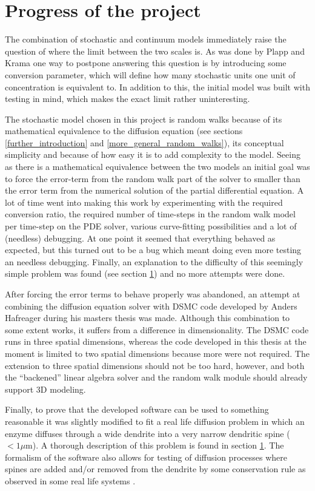 \documentclass[main.tex]{subfiles}
\begin{document}
\section{Progress of the project}
The combination of stochastic and continuum models immediately raise the question of where the limit between the two scales is. 
As was done by Plapp and Krama \cite{plapp2000multiscale} one way to postpone answering this question is by introducing some conversion parameter, which will define how many stochastic units one unit of concentration is equivalent to. 
In addition to this, the initial model was built with testing in mind, which makes the exact limit rather uninteresting. 

The stochastic model chosen in this project is random walks because of its mathematical equivalence to the diffusion equation (see sections \ref{further_introduction} and \ref{more_general_random_walks}), its conceptual simplicity and because of how easy it is to add complexity to the model. 
Seeing as there is a mathematical equivalence between the two models an initial goal was to force the error-term from the random walk part of the solver to smaller than the error term from the numerical solution of the partial differential equation. 
A lot of time went into making this work by experimenting with the required conversion ratio, the required number of time-steps in the random walk model per time-step on the PDE solver, various curve-fitting possibilities and a lot of (needless) debugging. 
At one point it seemed that everything behaved as expected, but this turned out to be a bug which meant doing even more testing an needless debugging. 
Finally, an explanation to the difficulty of this seemingly simple problem was found (see section \ref{}) and no more attempts were done. 

After forcing the error terms to behave properly was abandoned, an attempt at combining the diffusion equation solver with DSMC code developed by Anders Hafreager during his masters thesis was made. 
Although this combination to some extent works, it suffers from a difference in dimensionality. 
The DSMC code runs in three spatial dimensions, whereas the code developed in this thesis at the moment is limited to two spatial dimensions because more were not required. 
The extension to three spatial dimensions should not be too hard, however, and both the ``backened'' linear algebra solver and the random walk module should already support 3D modeling. 

Finally, to prove that the developed software can be used to something reasonable it was slightly modified to fit a real life diffusion problem in which an enzyme diffuses through a wide dendrite into a very narrow dendritic spine ($<1\mu$m). 
A thorough description of this problem is found in section \ref{}.
The formalism of the software also allows for testing of diffusion processes where spines are added and/or removed from the dendrite by some conservation rule as observed in some real life systems \cite{}.
\end{document}
